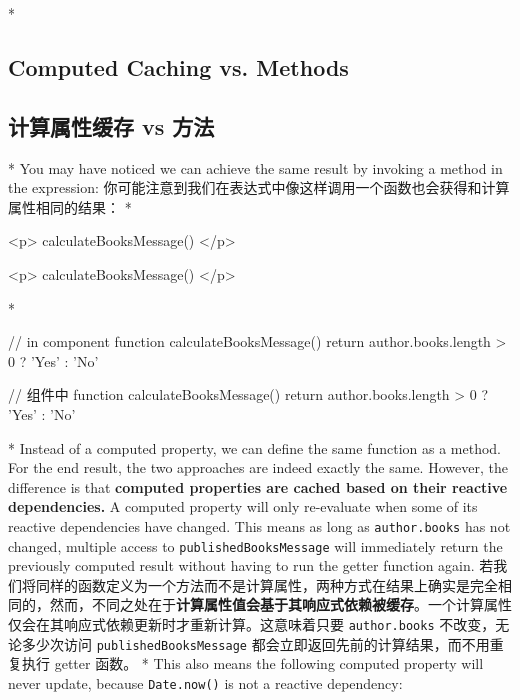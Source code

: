 \begin{paracol}{2}

\switchcolumn[0]*%
\subsection{Computed Caching vs. Methods}
\switchcolumn
\subsection{计算属性缓存 vs 方法}
\switchcolumn[0]*%
You may have noticed we can achieve the same result by invoking a method
in the expression:
\switchcolumn
你可能注意到我们在表达式中像这样调用一个函数也会获得和计算属性相同的结果：
\switchcolumn[0]*%
\begin{codeHtml}
<p>{{ calculateBooksMessage() }}</p>
\end{codeHtml}
\switchcolumn
\begin{codeHtml}
<p>{{ calculateBooksMessage() }}</p>
\end{codeHtml}
\switchcolumn[0]*%
\begin{codeJs}
// in component
function calculateBooksMessage() {
    return author.books.length > 0 ? 'Yes' : 'No'
}
\end{codeJs}
\switchcolumn
\begin{codeJs}
// 组件中
function calculateBooksMessage() {
    return author.books.length > 0 ? 'Yes' : 'No'
}
\end{codeJs}
\switchcolumn[0]*%
Instead of a computed property, we can define the same function as a
method. For the end result, the two approaches are indeed exactly the
same. However, the difference is that \textbf{computed properties are
cached based on their reactive dependencies.} A computed property will
only re-evaluate when some of its reactive dependencies have changed.
This means as long as \texttt{author.books} has not changed, multiple
access to \texttt{publishedBooksMessage} will immediately return the
previously computed result without having to run the getter function
again.
\switchcolumn
若我们将同样的函数定义为一个方法而不是计算属性，两种方式在结果上确实是完全相同的，然而，不同之处在于\textbf{计算属性值会基于其响应式依赖被缓存}。一个计算属性仅会在其响应式依赖更新时才重新计算。这意味着只要
\texttt{author.books} 不改变，无论多少次访问
\texttt{publishedBooksMessage}
都会立即返回先前的计算结果，而不用重复执行 getter 函数。
\switchcolumn[0]*%
This also means the following computed property will never update,
because \texttt{Date.now()} is not a reactive dependency:

\end{paracol}
